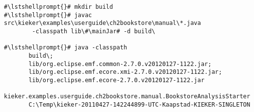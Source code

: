 \begin{lstlisting}[caption=Commands to compile and run the analysis under Windows,label=lst:bookstoreAnalysisStarterWin]
#\lstshellprompt{}# mkdir build
#\lstshellprompt{}# javac src\kieker\examples\userguide\ch2bookstore\manual\*.java 
        -classpath lib\#\mainJar# -d build\

#\lstshellprompt{}# java -classpath 
       build\;
       lib/org.eclipse.emf.common-2.7.0.v20120127-1122.jar;
       lib/org.eclipse.emf.ecore.xmi-2.7.0.v20120127-1122.jar;
       lib/org.eclipse.emf.ecore-2.7.0.v20120127-1122.jar
       kieker.examples.userguide.ch2bookstore.manual.BookstoreAnalysisStarter 
       C:\Temp\kieker-20110427-142244899-UTC-Kaapstad-KIEKER-SINGLETON
\end{lstlisting}	